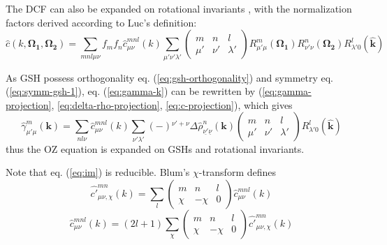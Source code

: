 The DCF can also be expanded on rotational invariants \citep{Blum_I},
with the normalization factors derived according to Luc's definition:
\begin{equation}
\hat{c}(k,\mathbf{\Omega_{1}},\mathbf{\Omega_{2}})=\sum_{mnl\mu\nu}f_{m}f_{n}\hat{c}_{\mu\nu}^{mnl}(k)\sum_{\mu'\nu'\lambda'}\left(\begin{array}{ccc}
m & n & l\\
\mu' & \nu' & \lambda'
\end{array}\right)R_{\mu'\mu}^{m}(\mathbf{\Omega_{1}})R_{\nu'\nu}^{n}(\mathbf{\Omega_{2}})R_{\lambda'0}^{l}(\hat{\mathbf{k}})\label{eq:c-projection}
\end{equation}


As GSH possess orthogonality eq. (\ref{eq:gsh-orthogonality}) and
symmetry eq. (\ref{eq:symm-gsh-1}), eq. (\ref{eq:gamma-k}) can be
rewritten by (\ref{eq:gamma-projection}, \ref{eq:delta-rho-projection},
\ref{eq:c-projection}), which gives
\begin{equation}
\hat{\gamma}_{\mu'\mu}^{m}(\mathbf{k})=\sum_{nl\nu}\hat{c}_{\mu\nu}^{mnl}(k)\sum_{\nu'\lambda'}\left(-\right){}^{\nu'+\nu}\Delta\hat{\rho}_{\underline{\nu'}\underline{\nu}}^{n}(\mathbf{k})\left(\begin{array}{ccc}
m & n & l\\
\mu' & \nu' & \lambda'
\end{array}\right)R_{\lambda'0}^{l}(\hat{\mathbf{k}})\label{eq:im}
\end{equation}
thus the OZ equation is expanded on GSHs and rotational invariants.

Note that eq. (\ref{eq:im}) is reducible. Blum's $\chi$-transform
defines\citep{Blum_II} 
\begin{equation}
\hat{c'}_{\mu\nu,\chi}^{mn}(k)=\sum_{l}\left(\begin{array}{ccc}
m & n & l\\
\chi & -\chi & 0
\end{array}\right)\hat{c}_{\mu\nu}^{mnl}(k)
\end{equation}
\begin{equation}
\hat{c}_{\mu\nu}^{mnl}(k)=\left(2l+1\right)\sum_{\chi}\left(\begin{array}{ccc}
m & n & l\\
\chi & -\chi & 0
\end{array}\right)\hat{c'}_{\mu\nu,\chi}^{mn}(k)\label{eq:c-p}
\end{equation}


